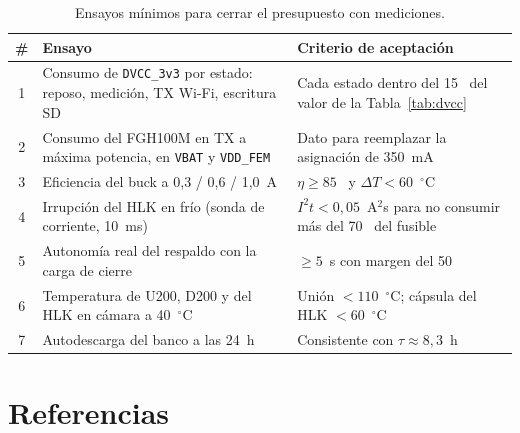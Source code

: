 \documentclass[11pt,a4paper]{article}
\newcommand{\pct}{\text{\char37}}
\begin{document}
\begin{table}[H]
\centering
\caption{Ensayos mínimos para cerrar el presupuesto con mediciones.}
\label{tab:ensayos}
\small
\begin{tabularx}{\textwidth}{@{}c X X@{}}
\toprule
\textbf{\#} & \textbf{Ensayo} & \textbf{Criterio de aceptación} \\
\midrule
1 & Consumo de \texttt{DVCC\_3v3} por estado: reposo, medición, TX Wi-Fi, escritura SD & Cada estado dentro del 15~\pct{} del valor de la Tabla~\ref{tab:dvcc} \\
2 & Consumo del FGH100M en TX a máxima potencia, en \texttt{VBAT} y \texttt{VDD\_FEM} & Dato para reemplazar la asignación de 350~mA \\
3 & Eficiencia del buck a 0,3 / 0,6 / 1,0~A & $\eta \ge 85$~\pct{} y $\Delta T < 60$~$^\circ$C \\
4 & Irrupción del HLK en frío (sonda de corriente, 10~ms) & $I^2t < 0{,}05$~A$^2$s para no consumir más del 70~\pct{} del fusible \\
5 & Autonomía real del respaldo con la carga de cierre & $\ge 5$~s con margen del 50~\pct{} \\
6 & Temperatura de U200, D200 y del HLK en cámara a 40~$^\circ$C & Unión $<110$~$^\circ$C; cápsula del HLK $<60$~$^\circ$C \\
7 & Autodescarga del banco a las 24~h & Consistente con $\tau\approx8{,}3$~h \\
\bottomrule
\end{tabularx}
\end{table}

\section*{Referencias}
\end{document}
